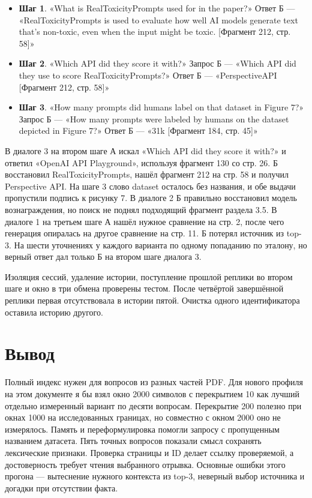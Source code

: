 \documentclass[12pt,a4paper]{article}
\providecommand{\tightlist}{\setlength{\itemsep}{0pt}\setlength{\parskip}{0pt}}
\begin{document}
\begin{itemize}
\tightlist
\item
  \textbf{Шаг 1}. «What is RealToxicityPrompts used for in the paper?»
  Ответ Б --- «RealToxicityPrompts is used to evaluate how well AI
  models generate text that's non-toxic, even when the input might be
  toxic. {[}Фрагмент 212, стр. 58{]}»
\item
  \textbf{Шаг 2}. «Which API did they score it with?» Запрос Б ---
  «Which API did they use to score RealToxicityPrompts?» Ответ Б ---
  «PerspectiveAPI {[}Фрагмент 212, стр. 58{]}»
\item
  \textbf{Шаг 3}. «How many prompts did humans label on that dataset in
  Figure 7?» Запрос Б --- «How many prompts were labeled by humans on
  the dataset depicted in Figure 7?» Ответ Б --- «31k {[}Фрагмент 184,
  стр. 45{]}»
\end{itemize}

В диалоге 3 на втором шаге А искал «Which API did they score it with?» и
ответил «OpenAI API Playground», используя фрагмент 130 со стр. 26. Б
восстановил RealToxicityPrompts, нашёл фрагмент 212 на стр. 58 и получил
Perspective API. На шаге 3 слово dataset осталось без названия, и обе
выдачи пропустили подпись к рисунку 7. В диалоге 2 Б правильно
восстановил модель вознаграждения, но поиск не поднял подходящий
фрагмент раздела 3.5. В диалоге 1 на третьем шаге А нашёл нужное
сравнение на стр. 2, после чего генерация опиралась на другое сравнение
на стр. 11. Б потерял источник из top-3. На шести уточнениях у каждого
варианта по одному попаданию по эталону, но верный ответ дал только Б на
втором шаге диалога 3.

Изоляция сессий, удаление истории, поступление прошлой реплики во втором
шаге и окно в три обмена проверены тестом. После четвёртой завершённой
реплики первая отсутствовала в истории пятой. Очистка одного
идентификатора оставила историю другого.

\hypertarget{ux432ux44bux432ux43eux434}{%
\section{Вывод}\label{ux432ux44bux432ux43eux434}}

Полный индекс нужен для вопросов из разных частей PDF. Для нового
профиля на этом документе я бы взял окно 2000 символов с перекрытием 10
как лучший отдельно измеренный вариант по десяти вопросам. Перекрытие
200 полезно при окнах 1000 на исследованных границах, но совместно с
окном 2000 оно не измерялось. Память и переформулировка помогли запросу
с пропущенным названием датасета. Пять точных вопросов показали смысл
сохранять лексические признаки. Проверка страницы и ID делает ссылку
проверяемой, а достоверность требует чтения выбранного отрывка. Основные
ошибки этого прогона --- вытеснение нужного контекста из top-3, неверный
выбор источника и догадки при отсутствии факта.
\end{document}
